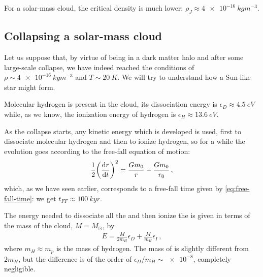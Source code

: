 \documentclass[main.tex]{subfiles}
\begin{document}

For a solar-mass cloud, the critical density is much lower: \(\rho _J \approx \SI{4e-16}{kg m^{-3}}\). 



\subsection{Collapsing a solar-mass cloud}

Let us suppose that, by virtue of being in a dark matter halo and after some large-scale collapse, we have indeed reached the conditions of \(\rho \sim \SI{4e-16}{kg m^{-3}}\) and \(T \sim \SI{20}{K}\).
We will try to understand how a Sun-like star might form.

Molecular hydrogen is present in the cloud, its dissociation energy is \(\epsilon _D \approx \SI{4.5}{eV}\) while, as we know, the ionization energy of hydrogen is \(\epsilon _H \approx \SI{13.6}{eV}\).

As the collapse starts, any kinetic energy which is developed is used, first to dissociate molecular hydrogen and then to ionize hydrogen, so for a while the evolution goes according to the free-fall equation of motion:
%
\begin{align}
  \frac{1}{2} \qty(\dv{r}{t})^2 = \frac{G m_0 }{r} - \frac{G m_0 }{r_0 }
\,,
\end{align}
%
which, as we have seen earlier, corresponds to a free-fall time given by \eqref{eq:free-fall-time}: we get \(t_{FF} \approx \SI{100}{kyr}\). 

The energy needed to dissociate all the  and then ionize the  is given in terms of the mass of the cloud, \(M = M_{\odot}\), by
%
\begin{align}
  E = \frac{M}{2 m_H} \epsilon_{D} + \frac{M}{m_H} \epsilon_{I}
\,,
\end{align}
%
where \(m_H \approx m_p\) is the mass of hydrogen. The mass of  is slightly different from \(2 m_H\), but the difference is of the order of \(\epsilon _D / m_H \sim \num{e-8}\), completely negligible.
\end{document}
